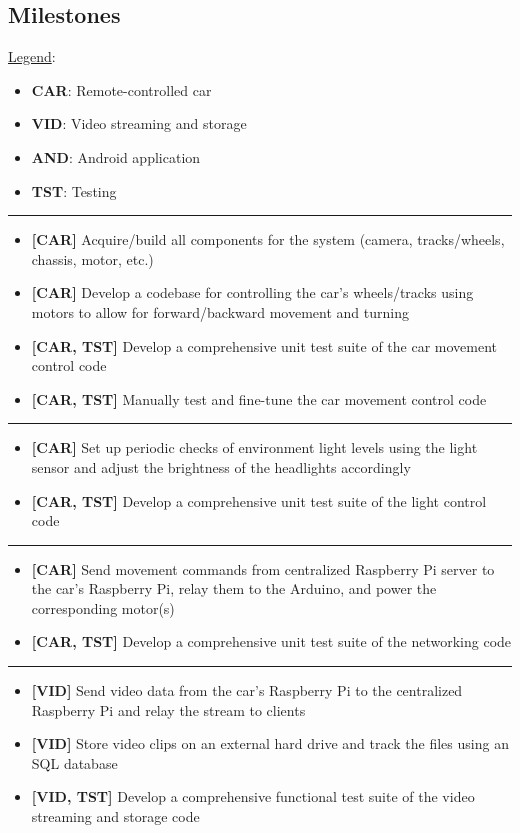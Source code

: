 \documentclass[letterpaper,12pt]{report}
\begin{document}
	\subsection*{Milestones}
	\markright{}
	\underline{Legend}:
	\begin{itemize}
		\item[] \textbf{CAR}: Remote-controlled car
		\item[] \textbf{VID}: Video streaming and storage
		\item[] \textbf{AND}: Android application
		\item[] \textbf{TST}: Testing
	\end{itemize}
	\noindent\rule{\textwidth}{0.5pt}
	\begin{itemize}
		\item \textbf{[CAR]} Acquire/build all components for the system
			(camera, tracks/wheels, chassis, motor, etc.)
		\item \textbf{[CAR]} Develop a codebase for controlling the car’s
			wheels/tracks using motors to allow for forward/backward movement
			and turning
		\item \textbf{[CAR, TST]} Develop a comprehensive unit test suite of the
			car movement control code
		\item \textbf{[CAR, TST]} Manually test and fine-tune the car movement
			control code
	\end{itemize}
	\noindent\rule{\textwidth}{0.5pt}
	\begin{itemize}
		\item \textbf{[CAR]} Set up periodic checks of environment light levels
			using the light sensor and adjust the brightness of the headlights
			accordingly
		\item \textbf{[CAR, TST]} Develop a comprehensive unit test suite of the
			light control code
	\end{itemize}
	\noindent\rule{\textwidth}{0.5pt}
	\begin{itemize}
		\item \textbf{[CAR]} Send movement commands from centralized Raspberry
			Pi server to the car’s Raspberry Pi, relay them to the Arduino, and
			power the corresponding motor(s)
		\item \textbf{[CAR, TST]} Develop a comprehensive unit test suite of the
			networking code
	\end{itemize}
	\noindent\rule{\textwidth}{0.5pt}
	\begin{itemize}
		\item \textbf{[VID]} Send video data from the car’s Raspberry Pi to the
			centralized Raspberry Pi and relay the stream to clients
		\item \textbf{[VID]} Store video clips on an external hard drive and
			track the files using an SQL database
		\item \textbf{[VID, TST]} Develop a comprehensive functional test suite
			of the video streaming and storage code
	\end{itemize}
\end{document}
